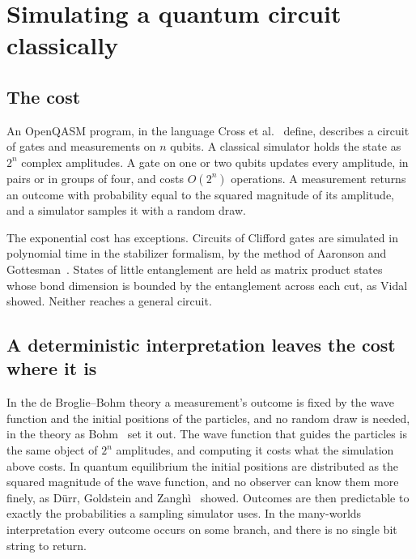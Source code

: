 \chapter{\texorpdfstring{Simulating a quantum circuit classically}{Simulating a quantum circuit classically}}
\label{chap:state-vectors}

\section{\texorpdfstring{The cost}{The cost}}

An OpenQASM program, in the language Cross et al.~\cite{src:OpenQASM-3} define, describes a circuit of gates and measurements on \(n\) qubits. A classical simulator holds the state as \(2^n\) complex amplitudes. A gate on one or two qubits updates every amplitude, in pairs or in groups of four, and costs \(O(2^n)\) operations. A measurement returns an outcome with probability equal to the squared magnitude of its amplitude, and a simulator samples it with a random draw.

The exponential cost has exceptions. Circuits of Clifford gates are simulated in polynomial time in the stabilizer formalism, by the method of Aaronson and Gottesman~\cite{src:Aaronson-Gottesman-2004}. States of little entanglement are held as matrix product states whose bond dimension is bounded by the entanglement across each cut, as Vidal~\cite{src:Vidal-2003} showed. Neither reaches a general circuit.

\section{\texorpdfstring{A deterministic interpretation leaves the cost where it is}{A deterministic interpretation leaves the cost where it is}}

In the de Broglie–Bohm theory a measurement's outcome is fixed by the wave function and the initial positions of the particles, and no random draw is needed, in the theory as Bohm~\cite{src:Bohm-1952} set it out. The wave function that guides the particles is the same object of \(2^n\) amplitudes, and computing it costs what the simulation above costs. In quantum equilibrium the initial positions are distributed as the squared magnitude of the wave function, and no observer can know them more finely, as Dürr, Goldstein and Zanghì~\cite{src:Durr-Goldstein-Zanghi-1992} showed. Outcomes are then predictable to exactly the probabilities a sampling simulator uses. In the many-worlds interpretation every outcome occurs on some branch, and there is no single bit string to return.


